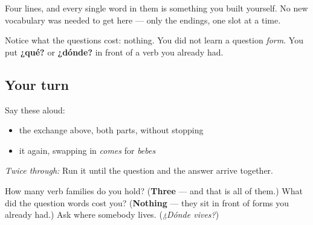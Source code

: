 Four lines, and every single word in them is something you built yourself. No new vocabulary was needed to get here — only the endings, one slot at a time.

Notice what the questions cost: nothing. You did not learn a question \emph{form}. You put \textbf{¿qué?} or \textbf{¿dónde?} in front of a verb you already had.

\subsection*{Your turn}
Say these aloud:

\begin{itemize}
\raggedright
  \item the exchange above, both parts, without stopping
  \item it again, swapping in \emph{comes} for \emph{bebes}
\end{itemize}

\emph{Twice through:} Run it until the question and the answer arrive together.

\begin{tcolorbox}[breakable,colback=teal!4,colframe=teal!35!black,title={Before you move on}]
How many verb families do you hold? (\textbf{Three} — and that is all of them.) What did the question words cost you? (\textbf{Nothing} — they sit in front of forms you already had.) Ask where somebody lives. (\emph{¿Dónde vives?})
\end{tcolorbox}
